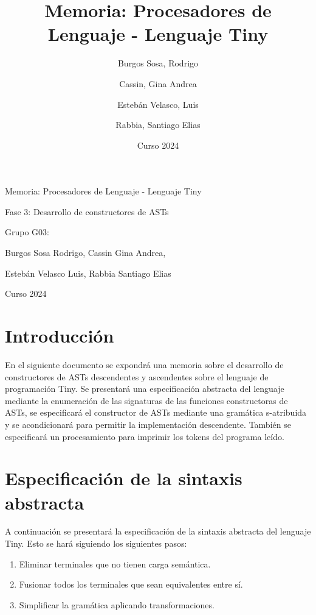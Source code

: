 \documentclass[11pt]{article}
\title{Memoria: Procesadores de Lenguaje - Lenguaje Tiny}
\author{Burgos Sosa, Rodrigo \and Cassin, Gina Andrea \and Estebán Velasco, Luis \and Rabbia, Santiago Elias}
\date{Curso 2024}
\begin{document}
\begin{titlepage}
    \centering
    {\Huge Memoria: Procesadores de Lenguaje - Lenguaje Tiny \par}
    \vspace{1cm}
    {\Large Fase 3: Desarrollo de constructores de ASTs \par}
    \vspace{2cm}
    {\Large Grupo G03: \par}
    {\Large Burgos Sosa Rodrigo, Cassin Gina Andrea, \par}
    {\Large Estebán Velasco Luis, Rabbia Santiago Elias \par}
    \vspace{2cm}
    {\Large Curso 2024 \par}
\end{titlepage}
\thispagestyle{empty}

    \newpage

    \section{Introducción}
        En el siguiente documento se expondrá una memoria sobre el desarrollo de constructores de ASTs descendentes y ascendentes sobre el lenguaje de programación Tiny.
        Se presentará una especificación abstracta del lenguaje mediante la enumeración de las signaturas de las funciones constructoras de ASTs, se especificará el constructor de ASTs mediante una gramática s-atribuida y se acondicionará para permitir la implementación descendente. También se especificará un procesamiento para imprimir los tokens del programa leído. 

    \section{Especificación de la sintaxis abstracta}
        A continuación se presentará la especificación de la sintaxis abstracta del lenguaje Tiny. Esto se hará siguiendo los siguientes pasos:
        \begin{enumerate}
            \item Eliminar terminales que no tienen carga semántica.
            \item Fusionar todos los terminales que sean equivalentes entre sí.
            \item Simplificar la gramática aplicando transformaciones.
        \end{enumerate}
\end{document}
